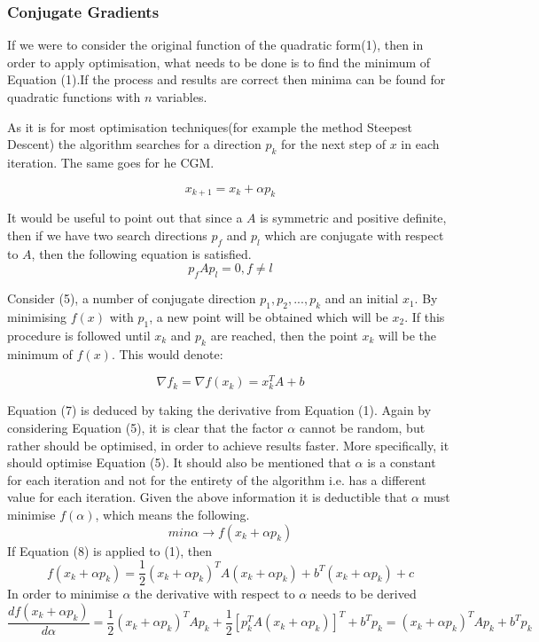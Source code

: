 \documentclass[12pt,a4paper]{article}
\begin{document}
\subsubsection{Conjugate Gradients\cite{press2007numerical}\cite{shewchuk1994introduction}\cite{cgm2009lec}}
If we were to consider the original function of the quadratic form(1), then in order to apply optimisation, what needs to be done is to find the minimum of Equation (1).If the process and results are correct then minima can be found for quadratic functions with $n$ variables.

As it is for most optimisation techniques(for example the method Steepest Descent\cite{rosenbloom1956method}) the algorithm searches for a direction $p_k$ for the next step of $x$ in each iteration. The same goes for he CGM.

\begin{equation}
x_{k+1}=x_k+\alpha p_k
\end{equation}

It would be useful to point out that since a $A$ is symmetric and positive definite, then if we have two search directions $p_f$ and $p_{l}$ which are conjugate with respect to $A$, then the following equation is satisfied.\cite{rast2012managing}
\begin{equation}
p_fAp_l=0, f\neq l
\end{equation}

Consider (5), a number of conjugate direction $p_1,p_2,...,p_{k}$ and an initial $x_1$. By minimising $f(x)$ with $p_1$, a new point will be obtained which will be $x_2$. If this procedure is followed until $x_k$ and $p_k$ are reached, then the point $x_k$ will be the minimum of $f(x)$. This would denote:

\begin{equation}
\nabla f_k=\nabla f(x_k)=x_k^TA+b
\end{equation}

Equation (7) is deduced by taking the derivative from Equation (1). Again by considering Equation (5), it is clear that the factor $\alpha$ cannot be random, but rather should be optimised, in order to achieve results faster. More specifically, it should optimise Equation (5). It should also be mentioned that $\alpha$ is a constant for each iteration and not for the entirety of the algorithm i.e. has a different value for each iteration. Given the above information it is deductible that $\alpha$ must minimise $f(\alpha)$, which means the following.
\begin{equation}
min \alpha \to f(x_k+\alpha p_k)
\end{equation}
If Equation (8) is applied to (1), then
\begin{equation}
f(x_k+\alpha p_k)=\frac{1}{2}(x_k+\alpha p_k)^TA(x_k+\alpha p_k)+b^T(x_k+\alpha p_k) + c
\end{equation}
In order to minimise $\alpha$ the derivative with respect to $\alpha$ needs to be derived
\begin{equation}
\frac{df(x_k+\alpha p_k)}{d\alpha}=\frac{1}{2}(x_k+\alpha p_k)^TAp_k+\frac{1}{2}[p_k^TA(x_k+\alpha p_k)]^T+b^Tp_k=(x_k+\alpha p_k)^TAp_k+b^Tp_k
\end{equation}
\end{document}
